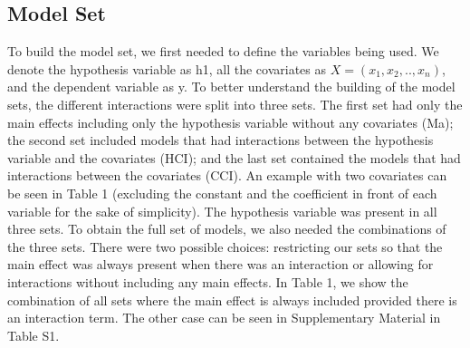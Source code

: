 \subsection{Model Set}
To build the model set, we first needed to define the variables being used. We denote the hypothesis variable as h1, all the covariates as $X=(x_1,x_2,..,x_n)$, and the dependent variable as y. To better understand the building of the model sets, the different interactions were split into three sets. The first set had only the main effects including only the hypothesis variable without any covariates (Ma); the second set included models that had interactions between the hypothesis variable and the covariates (HCI); and the last set contained the models that had interactions between the covariates (CCI). An example with two covariates can be seen in Table 1 (excluding the constant and the coefficient in front of each variable for the sake of simplicity). The hypothesis variable was present in all three sets.
To obtain the full set of models, we also needed the combinations of the three sets. There were two possible choices: restricting our sets so that the main effect was always present when there was an interaction or allowing for interactions without including any main effects. In Table 1, we show the combination of all sets where the main effect is always included provided there is an interaction term. The other case can be seen in Supplementary Material in Table S1. \\
\newpage
